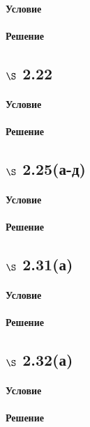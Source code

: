 \documentclass[a4paper,12pt]{article}
\begin{document}
\paragraph*{Условие}
\paragraph*{Решение}

\subsection*{$\S$ 2.22}
\paragraph*{Условие}
\paragraph*{Решение}

\subsection*{$\S$ 2.25(а-д)}
\paragraph*{Условие}
\paragraph*{Решение}

\subsection*{$\S$ 2.31(а)}
\paragraph*{Условие}
\paragraph*{Решение}

\subsection*{$\S$ 2.32(а)}
\paragraph*{Условие}
\paragraph*{Решение}
\end{document}

